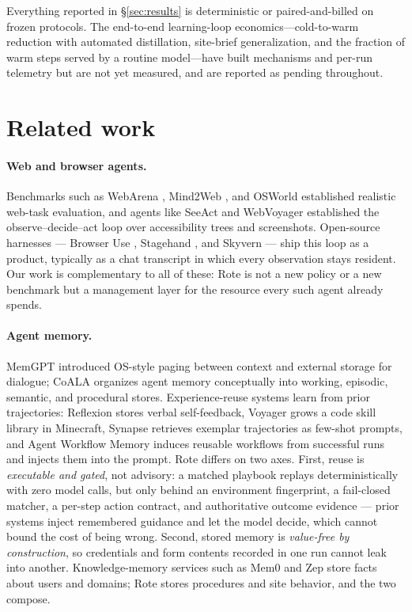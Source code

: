 \documentclass{article} %
\newcommand{\campaignresult}[1]{}
\newcommand{\campaignpending}{The end-to-end learning-loop economics---cold-to-warm
reduction with automated distillation, site-brief generalization, and the fraction of
warm steps served by a routine model---have built mechanisms and per-run telemetry but
are not yet measured, and are reported as pending throughout.}
\begin{document}
Everything reported in \S\ref{sec:results} is deterministic or paired-and-billed on
frozen protocols. \campaignpending{}\campaignresult{Fold the campaign's results into
\S\ref{sec:results-learning} and the abstract here.}

\section{Related work}
\label{sec:related}

\paragraph{Web and browser agents.} Benchmarks such as WebArena
\citep{zhou2023webarena}, Mind2Web \citep{deng2023mind2web}, and OSWorld
\citep{xie2024osworld} established realistic web-task evaluation, and agents like SeeAct
\citep{zheng2024seeact} and WebVoyager \citep{he2024webvoyager} established the
observe--decide--act loop over accessibility trees and screenshots. Open-source harnesses
--- Browser Use \citep{browseruse2024}, Stagehand \citep{stagehand2024}, and Skyvern
\citep{skyvern2024} --- ship this loop as a product, typically as a chat transcript in
which every observation stays resident. Our work is complementary to all of these: Rote
is not a new policy or a new benchmark but a management layer for the resource every such
agent already spends.

\paragraph{Agent memory.} MemGPT \citep{packer2023memgpt} introduced OS-style paging
between context and external storage for dialogue; CoALA \citep{sumers2023coala}
organizes agent memory conceptually into working, episodic, semantic, and procedural
stores. Experience-reuse systems learn from prior trajectories: Reflexion
\citep{shinn2023reflexion} stores verbal self-feedback, Voyager \citep{wang2023voyager}
grows a code skill library in Minecraft, Synapse \citep{zheng2023synapse} retrieves
exemplar trajectories as few-shot prompts, and Agent Workflow Memory
\citep{wang2024awm} induces reusable workflows from successful runs and injects them
into the prompt. Rote differs on two axes. First, reuse is \emph{executable and gated},
not advisory: a matched playbook replays deterministically with zero model calls, but
only behind an environment fingerprint, a fail-closed matcher, a per-step action
contract, and authoritative outcome evidence --- prior systems inject remembered
guidance and let the model decide, which cannot bound the cost of being wrong. Second,
stored memory is \emph{value-free by construction}, so credentials and form contents
recorded in one run cannot leak into another. Knowledge-memory services such as Mem0
\citep{mem0:2024} and Zep \citep{zep2025} store facts about users and domains; Rote
stores procedures and site behavior, and the two compose.
\end{document}
